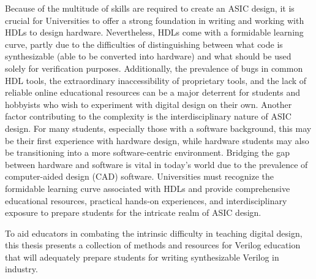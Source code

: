 Because of the multitude of skills are required to create an ASIC design, it is crucial for Universities to offer a strong foundation in writing and working with HDLs to design hardware. Nevertheless, HDLs come with a formidable learning curve, partly due to the difficulties of distinguishing between what code is synthesizable (able to be converted into hardware) and what should be used solely for verification purposes. Additionally, the prevalence of bugs in common HDL tools, the extraordinary inaccessibility of proprietary tools, and the lack of reliable online educational resources can be a major deterrent for students and hobbyists who wish to experiment with digital design on their own. Another factor contributing to the complexity is the interdisciplinary nature of ASIC design. For many students, especially those with a software background, this may be their first experience with hardware design, while hardware students may also be transitioning into a more software-centric environment. Bridging the gap between hardware and software is vital in today's world due to the prevalence of computer-aided design (CAD) software. Universities must recognize the formidable learning curve associated with HDLs and provide comprehensive educational resources, practical hands-on experiences, and interdisciplinary exposure to prepare students for the intricate realm of ASIC design.

To aid educators in combating the intrinsic difficulty in teaching digital design, this thesis presents a collection of methods and resources for Verilog education that will adequately prepare students for writing synthesizable Verilog in industry.


